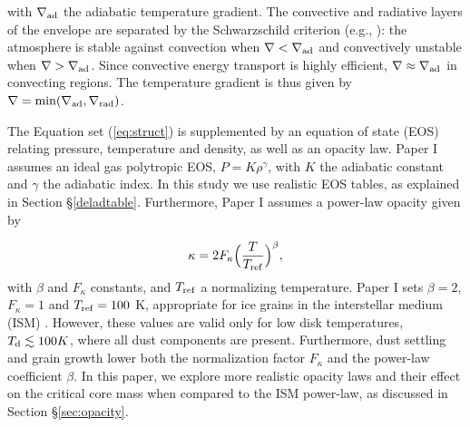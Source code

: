 \documentclass[apj]{emulateapj}
\newcommand{\delad}{\nabla_{\rm ad}}
\newcommand{\delrad}{\nabla_{\rm rad}}
\newcommand{\di}{_{\rm d}}
\begin{document}
\noindent with $\delad$ the adiabatic temperature gradient. The convective and radiative layers of the envelope are separated by the Schwarzschild criterion (e.g., \citealt{thompson06}): the atmosphere is stable against convection when $\nabla < \delad$ and convectively unstable when $\nabla > \delad$. Since convective energy transport is highly efficient,  $\nabla \approx \delad$ in convecting regions. The temperature gradient is thus given by $\nabla=\mathrm{min}(\delad, \delrad)$. 

The Equation set (\ref{eq:struct}) is supplemented by an equation of state (EOS) relating pressure, temperature and density, as well as an opacity law. Paper I assumes an ideal gas polytropic EOS, $P=K\rho^{\gamma}$, with $K$ the adiabatic constant and $\gamma$ the adiabatic index. In this study we use realistic EOS tables, as explained in Section \S\ref{deladtable}. Furthermore, Paper I assumes a power-law opacity given by

\begin{equation}
\label{eq:opacitylaw}
\kappa=2 F_{\kappa} \Big(\frac{T}{T_{\rm ref}}\Big)^{\beta},
\end{equation}  
\noindent with $\beta$ and $F_{\kappa}$ constants, and $T_{\rm{ref}}$ a normalizing temperature. Paper I sets $\beta=2$, $F_{\kappa}=1$ and $T_{\rm ref}=100$ K, appropriate for ice grains in the interstellar medium (ISM) \citep{bell94}. However, these values are valid only for low disk temperatures, $T\di \lesssim 100 K$, where all dust components are present. Furthermore, dust settling and grain growth lower both the normalization factor $F_{\kappa}$ and the power-law coefficient $\beta$. In this paper, we explore more realistic opacity laws and their effect on the critical core mass when compared to the ISM power-law, as discussed in Section \S\ref{sec:opacity}.



\end{document}
